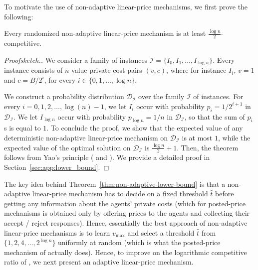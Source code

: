 To motivate the use of non-adaptive linear-price mechanisms, we first prove the following: 

\begin{theorem}\label{thm:non-adaptive-lower-bound} Every randomized non-adaptive linear-price mechanism is at least $\frac{\log n}{2}$-competitive.
\end{theorem}

\begin{proof}[Proofsketch.]
We consider a family of instances $\mathcal{I} = \{ I_0, I_1, ..., I_{\log n} \}$. Every instance consists of $n$ value-private cost pairs $(v,c)$, where for instance $I_i$, $v = 1$ and $c = B/2^i$, for every $i \in \{0,1,...,\log n\}$. %

We construct a probability distribution $\mathcal{D}_{\mathcal{I}}$ over the family $\mathcal{I}$ of instances. For every $i = 0, 1, 2, \ldots, \log(n)-1$, we let $I_{i}$ occur with probability $p_{i} = 1/2^{i+1}$ in $\mathcal{D}_{\mathcal{I}}$. We let $I_{\log n}$ occur with probability $p_{\log n} = 1/n$ in $\mathcal{D}_{\mathcal{I}}$, so that the sum of $p_i$s is equal to $1$. To conclude the proof, we show that the expected value of any deterministic non-adaptive linear-price mechanism on $\mathcal{D}_{\mathcal{I}}$ is at most $1$, while the expected value of the optimal solution on $\mathcal{D}_{\mathcal{I}}$ is $\frac{\log n}{2}+1$. Then, the theorem follows from Yao's principle %
(\cite[Chapter~8.4]{BoroYan1998} and \cite{Yao1977}). We provide a detailed proof in Section~\ref{sec:app:lower_bound}.
\end{proof}

The key idea behind Theorem~\ref{thm:non-adaptive-lower-bound} is that a non-adaptive linear-price mechanism has to decide on a fixed threshold $\hat{t}$ before getting any information about the agents' private costs (which for posted-price mechanisms is obtained only by offering prices to the agents and collecting their accept / reject responses). Hence, essentially the best approach of non-adaptive linear-price mechanisms is to learn $v_{\max}$ and select a threshold $\hat{t}$ from $\{ 1, 2, 4, \ldots, 2^{\log n}\}$ uniformly at random (which is what the posted-price mechanism of \cite[Section~4]{Bada2012} actually does). Hence, to improve on the logarithmic competitive ratio of \cite[Section~4]{Bada2012}, we next present an adaptive linear-price mechanism. 